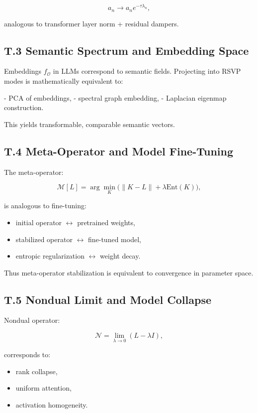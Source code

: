 \documentclass[12pt]{article}
\begin{document}
\[
a_n \to a_n e^{-\tau \lambda_n},
\]

analogous to transformer layer norm + residual dampers.

\subsection*{T.3 Semantic Spectrum and Embedding Space}

Embeddings $f_{\mathcal O}$ in LLMs correspond to semantic fields.  
Projecting into RSVP modes is mathematically equivalent to:

- PCA of embeddings,
- spectral graph embedding,
- Laplacian eigenmap construction.

This yields transformable, comparable semantic vectors.

\subsection*{T.4 Meta-Operator and Model Fine-Tuning}

The meta-operator:

\[
\mathcal{M}[L] = \arg\min_K \big( \|K-L\| + \lambda \mathrm{Ent}(K) \big),
\]

is analogous to fine-tuning:

\begin{itemize}
\item initial operator $\leftrightarrow$ pretrained weights,
\item stabilized operator $\leftrightarrow$ fine-tuned model,
\item entropic regularization $\leftrightarrow$ weight decay.
\end{itemize}

Thus meta-operator stabilization is equivalent to convergence in parameter space.

\subsection*{T.5 Nondual Limit and Model Collapse}

Nondual operator:

\[
\mathcal{N} = \lim_{\lambda\to 0}(L-\lambda I),
\]

corresponds to:

\begin{itemize}
\item rank collapse,
\item uniform attention,
\item activation homogeneity.
\end{itemize}
\end{document}

